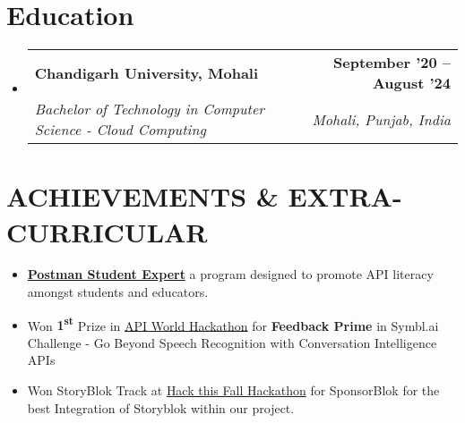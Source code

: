 \documentclass[letterpaper,11pt]{article}
\makeatletter
\newcommand{\achievementItem}[1]{
  \item\normalsize{
    {#1 \vspace{-6pt}}
  }
}
\newcommand{\resumeSubheading}[4]{
  \vspace{-2pt}\item
    \begin{tabular*}{1.0\textwidth}[t]{l@{\extracolsep{\fill}}r}
      \textbf{#1} & \textbf{\normalsize #2} \\
      \textit{\normalsize#3} & \textit{\normalsize #4} \\
    \end{tabular*}\vspace{-7pt}
}
\newcommand{\resumeSubHeadingListStart}{\begin{itemize}[leftmargin=0.0in, label={}]}
\newcommand{\resumeSubHeadingListEnd}{\end{itemize}}
\makeatother
\begin{document}
\section{Education}
  \resumeSubHeadingListStart
    \resumeSubheading
      {Chandigarh University, Mohali}{September '20 -- August '24}
      {Bachelor of Technology in Computer Science - Cloud Computing}{Mohali, Punjab, India}
  \resumeSubHeadingListEnd


\section{ACHIEVEMENTS \& EXTRA-CURRICULAR}

\begin{itemize}[leftmargin=0.2in]
  \achievementItem{\href{https://badgr.com/public/assertions/VVxNa822Quinhvm6DbWzoA}{\textbf{Postman Student Expert}} a program designed to promote API literacy amongst students and educators.}
  \achievementItem{Won \textbf{1\textsuperscript{st}} Prize in \href{https://apiworld.co/hackathon}{API World Hackathon} for \textbf{Feedback Prime} in Symbl.ai Challenge - Go Beyond Speech Recognition with Conversation Intelligence APIs}
  \achievementItem{Won StoryBlok Track at \href{https://hackthisfall.tech/}{Hack this Fall Hackathon} for SponsorBlok for the best Integration of Storyblok within our project. }
\end{itemize}
        
\end{document}

